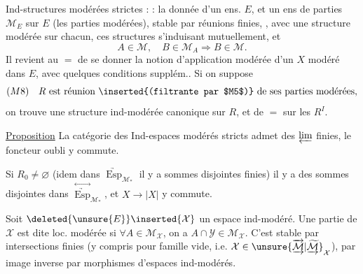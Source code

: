 Ind-structures modérées strictes   :  : la donnée d'un ens. $E$, et un ens de parties $\mathcal M_E$ sur $E$ (les parties modérées), stable par réunions finies, , avec une structure modérée sur chacun, ces structures s'induisant mutuellement, et
\[
 A\in\mathcal M,\quad B\in\mathcal M_A\Longrightarrow B\in\mathcal M.
\]
Il revient au $=$ de se donner la notion d'application modérée d'un $X$ modéré dans $E$, avec  quelques conditions supplém.. Si on suppose
\[
 (M8)\quad R\text{ est réunion \inserted{(filtrante par $M5$)} de ses parties modérées},
\]
on trouve une structure ind-modérée canonique sur $R$, et de $=$ sur les $R^I$.

\uline{Proposition} La catégorie des   Ind-espaces modérés stricts admet des $\varprojlim$ finies, le foncteur oubli y commute.

Si $R_0\ne\varnothing$ (idem dans $\underrightarrow{\operatorname{Esp}}_{\mathcal M_*}$ il y a sommes disjointes finies) il y a des sommes disjointes   dans $\overset{\leftrightarrow}{\underrightarrow{\operatorname{Esp}}}_{\mathcal M_*}$, et $X\longrightarrow |X|$ y commute.

Soit $\deleted{\unsure{E}}\inserted{\mathcal X}$ un espace ind-modéré. Une partie  de $\mathcal X$ est dite loc. modérée si $\forall A\in\mathcal M_{\mathcal X}$, on a $A\cap\mathcal Y\in\mathcal M_{\mathcal X}$. C'est stable par intersections finies (y compris pour famille vide, i.e. $\mathcal X\in\unsure{\underrightarrow{\overrightarrow{\mathcal M}}|\underrightarrow{\widetilde{\mathcal M}}}_{\mathcal X}$), par image inverse par morphismes  d'espaces ind-modérés.

